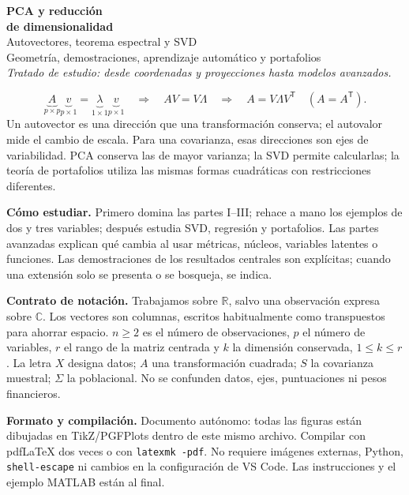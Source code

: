 \documentclass[11pt,a4paper]{article}
\newcommand{\R}{\mathbb R}
\newcommand{\T}{^{\mathsf T}}
\theoremstyle{definition}
\begin{document}
\begin{center}
{\Huge\bfseries\color{azul}PCA y reducción\\[3pt]de dimensionalidad}\\[7pt]
{\Large Autovectores, teorema espectral y SVD}\\[4pt]
{\large Geometría, demostraciones, aprendizaje automático y portafolios}\\[6pt]
\textit{Tratado de estudio: desde coordenadas y proyecciones hasta modelos avanzados.}
\end{center}
\begin{idea}
\[
\boxed{\underbrace{A}_{p\times p}\underbrace{v}_{p\times1}
=\underbrace{\lambda}_{1\times1}\underbrace{v}_{p\times1}}
\quad\Longrightarrow\quad
\boxed{AV=V\Lambda}\quad\Longrightarrow\quad
\boxed{A=V\Lambda V\T}\quad(A=A\T).
\]
Un autovector es una dirección que una transformación conserva; el autovalor mide el cambio de escala. Para una covarianza, esas direcciones son ejes de variabilidad. PCA conserva las de mayor varianza; la SVD permite calcularlas; la teoría de portafolios utiliza las mismas formas cuadráticas con restricciones diferentes.
\end{idea}
\textbf{Cómo estudiar.} Primero domina las partes I--III; rehace a mano los ejemplos de dos y tres variables; después estudia SVD, regresión y portafolios. Las partes avanzadas explican qué cambia al usar métricas, núcleos, variables latentes o funciones. Las demostraciones de los resultados centrales son explícitas; cuando una extensión solo se presenta o se bosqueja, se indica.

\textbf{Contrato de notación.} Trabajamos sobre $\R$, salvo una observación expresa sobre $\mathbb C$. Los vectores son columnas, escritos habitualmente como transpuestos para ahorrar espacio. $n\ge2$ es el número de observaciones, $p$ el número de variables, $r$ el rango de la matriz centrada y $k$ la dimensión conservada, $1\le k\le r$. La letra $X$ designa datos; $A$ una transformación cuadrada; $S$ la covarianza muestral; $\Sigma$ la poblacional. No se confunden datos, ejes, puntuaciones ni pesos financieros.

\textbf{Formato y compilación.} Documento autónomo: todas las figuras están dibujadas en TikZ/PGFPlots dentro de este mismo archivo. Compilar con pdfLaTeX dos veces o con \texttt{latexmk -pdf}. No requiere imágenes externas, Python, \texttt{shell-escape} ni cambios en la configuración de VS Code. Las instrucciones y el ejemplo MATLAB están al final.
\end{document}
